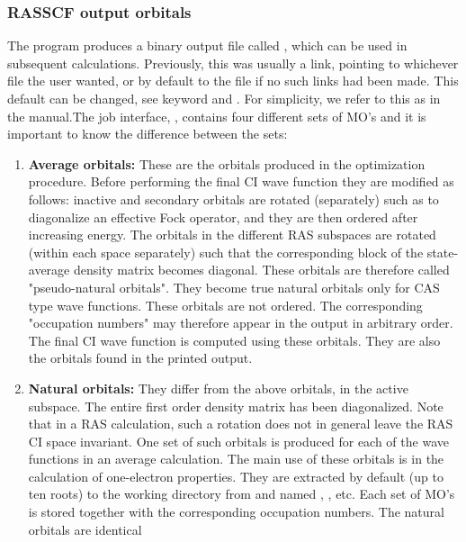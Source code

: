 \subsubsection{RASSCF output orbitals}
\label{UG:sec:rasscf_orbitals}

The  program produces a binary output file called
, which can be used in subsequent calculations. Previously, this
was usually a link, pointing to whichever file the user wanted, or by default
to the file  if no such links had been made. This default
can be changed, see keyword  and .
For simplicity, we refer to this as  in the manual.The job interface,
, contains four different sets of MO's and
it is important to know the difference between the sets:
\begin{enumerate}
\itemsep 9pt plus 3pt minus 3pt
\item
{\bf Average orbitals:}
These are the orbitals produced in the optimization
procedure. Before performing the final CI wave function they are
modified as follows: inactive and secondary orbitals are rotated
(separately) such as to diagonalize an effective Fock operator, and
they are then ordered after increasing energy. The orbitals in the
different RAS subspaces are rotated (within each space separately)
such that the corresponding block of the state-average density matrix becomes
diagonal. These orbitals are therefore called "pseudo-{}natural
orbitals". They become true natural orbitals only for CAS type wave
functions. These orbitals are not ordered. The corresponding
"occupation numbers" may therefore appear in the output in arbitrary
order. The final CI wave function is computed using these orbitals.
They are also the orbitals found in the printed output.
\item
{\bf Natural orbitals:}
They differ from the above orbitals, in the active
subspace. The entire first order density matrix has been diagonalized.
Note that in a RAS calculation, such a rotation does not in general
leave the RAS CI space invariant. One set of such orbitals is produced
for each of the wave functions in an average 
calculation. The main use of these orbitals is in
the calculation of one-{}electron properties. They are extracted by default
(up to ten roots)
to the working directory from  and named ,
, etc.
Each set of MO's is stored together with the
corresponding occupation numbers. The natural orbitals are identical

\end{enumerate}
